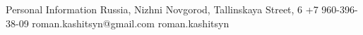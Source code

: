 \begin{rubric}{Personal Information}
  Russia, Nizhni Novgorod, Tallinskaya Street, 6
 \entry*[Phone] +7 960-396-38-09
 \entry*[E-mail] roman.kashitsyn@gmail.com
 \entry*[skype] roman.kashitsyn
\end{rubric}
